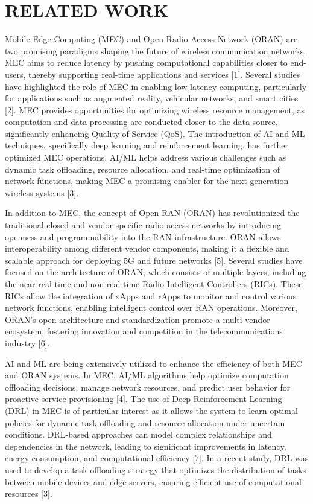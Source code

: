 \section{RELATED WORK}
Mobile Edge Computing (MEC) and Open Radio Access Network (ORAN) are two promising paradigms shaping the future of wireless communication networks. MEC aims to reduce latency by pushing computational capabilities closer to end-users, thereby supporting real-time applications and services [1]. Several studies have highlighted the role of MEC in enabling low-latency computing, particularly for applications such as augmented reality, vehicular networks, and smart cities [2]. MEC provides opportunities for optimizing wireless resource management, as computation and data processing are conducted closer to the data source, significantly enhancing Quality of Service (QoS). The introduction of AI and ML techniques, specifically deep learning and reinforcement learning, has further optimized MEC operations. AI/ML helps address various challenges such as dynamic task offloading, resource allocation, and real-time optimization of network functions, making MEC a promising enabler for the next-generation wireless systems [3].

In addition to MEC, the concept of Open RAN (ORAN) has revolutionized the traditional closed and vendor-specific radio access networks by introducing openness and programmability into the RAN infrastructure. ORAN allows interoperability among different vendor components, making it a flexible and scalable approach for deploying 5G and future networks [5]. Several studies have focused on the architecture of ORAN, which consists of multiple layers, including the near-real-time and non-real-time Radio Intelligent Controllers (RICs). These RICs allow the integration of xApps and rApps to monitor and control various network functions, enabling intelligent control over RAN operations. Moreover, ORAN's open architecture and standardization promote a multi-vendor ecosystem, fostering innovation and competition in the telecommunications industry [6].

AI and ML are being extensively utilized to enhance the efficiency of both MEC and ORAN systems. In MEC, AI/ML algorithms help optimize computation offloading decisions, manage network resources, and predict user behavior for proactive service provisioning [4]. The use of Deep Reinforcement Learning (DRL) in MEC is of particular interest as it allows the system to learn optimal policies for dynamic task offloading and resource allocation under uncertain conditions. DRL-based approaches can model complex relationships and dependencies in the network, leading to significant improvements in latency, energy consumption, and computational efficiency [7]. In a recent study, DRL was used to develop a task offloading strategy that optimizes the distribution of tasks between mobile devices and edge servers, ensuring efficient use of computational resources [3].

